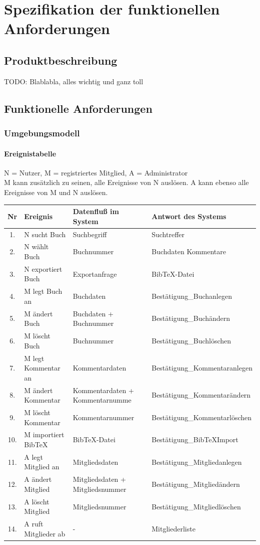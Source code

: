 \chapter{Spezifikation der funktionellen Anforderungen}
\section{Produktbeschreibung}
TODO: Blablabla, alles wichtig und ganz toll

\section{Funktionelle Anforderungen}
\subsection{Umgebungsmodell}

\subsubsection{Ereignistabelle}
N = Nutzer, M = registriertes Mitglied, A = Administrator \\
M kann zusätzlich zu seinen, alle Ereignisse von N auslösen. A kann ebenso alle Ereignisse von M und N auslösen.

\begin{tabular}[ht]{|c|p{9.0em}|p{10.5em}|l|}
\hline
Nr & Ereignis & Datenfluß im System & Antwort des Systems \\
\hline\hline
1. & N sucht Buch & Suchbegriff & Suchtreffer \\\hline
2. & N wählt Buch & Buchnummer & Buchdaten Kommentare \\\hline
3. & N exportiert Buch & Exportanfrage &  BibTeX-Datei \\\hline
4. & M legt Buch an & Buchdaten & Bestätigung\_Buchanlegen \\\hline
5. & M ändert Buch & Buchdaten + Buchnummer & Bestätigung\_Buchändern\\\hline
6. & M löscht Buch & Buchnummer & Bestätigung\_Buchlöschen \\\hline
7. & M legt Kommentar an & Kommentardaten & Bestätigung\_Kommentaranlegen \\\hline
8. & M ändert Kommentar & Kommentardaten + Kommentarnumme & Bestätigung\_Kommentarändern \\\hline
9. & M löscht Kommentar & Kommentarnummer & Bestätigung\_Kommentarlöschen \\\hline
10.& M importiert BibTeX & BibTeX-Datei & Bestätigung\_BibTeXImport \\\hline
11.& A legt Mitglied an & Mitgliedsdaten & Bestätigung\_Mitgliedanlegen \\\hline
12.& A ändert Mitglied & Mitgliedsdaten + Mitgliedsnummer & Bestätigung\_Mitgliedändern \\\hline
13.& A löscht Mitglied & Mitgliedsnummer & Bestätigung\_Mitgliedlöschen \\\hline
14.& A ruft Mitglieder ab & - & Mitgliederliste \\\hline
\end{tabular}

